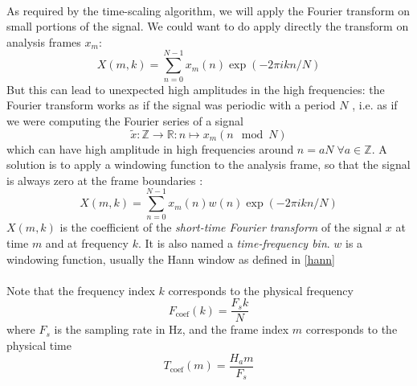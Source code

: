 \documentclass[letterpaper]{article}
\theoremstyle{definition}
\theoremstyle{remark}
\begin{document}
\paragraph{}
As required by the time-scaling algorithm, we will apply the Fourier transform
on small portions of the signal. We could want to do apply directly the
transform on analysis frames \(x_m\):
\begin{equation*}
X(m,k)=\sum_{n=0}^{N-1}x_m(n)\exp(-2\pi ikn/N)
\end{equation*}
But this can lead to unexpected high amplitudes in the high frequencies: the
Fourier transform works as if the signal was periodic with a period \(N\)
\citep{Dolson1986}, i.e. as if we were computing the Fourier series of a signal
\begin{equation}
\tilde x:\mathbb{Z}\to\mathbb{R}:n\mapsto x_m(n\mod N)
\end{equation}
which can have high amplitude in high frequencies around
\(n=aN\;\forall a\in\mathbb{Z}\).
A solution is to apply a windowing function to the analysis frame, so that the
signal is always zero at the frame boundaries \citep{gabor1946theory}:
\begin{equation}
	X(m,k) = \sum_{n=0}^{N-1}x_m(n)w(n)\exp(-2\pi ikn/N)
\end{equation}
\(X(m,k)\) is the coefficient of the \emph{short-time Fourier transform} of
the signal \(x\) at time \(m\) and at frequency \(k\). It is also named a
\emph{time-frequency bin}. \(w\) is a windowing function, usually the Hann
window as defined in \eqref{hann}

\paragraph{}
Note that the frequency index \(k\) corresponds to the physical frequency
\begin{equation}
	\label{frequency_index}
	F_{\text{coef}}(k) = \frac{F_s k}{N}
\end{equation}
where \(F_s\) is the sampling rate in Hz, and the frame index \(m\) corresponds
to the physical time
\begin{equation}
	T_{\text{coef}}(m) = \frac{H_a m}{F_s}
\end{equation}
\end{document}

